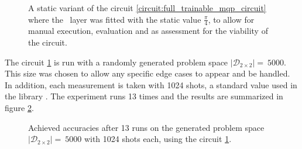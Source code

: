 \begin{figure}[!h]
    \centering
    \caption{A static variant of the circuit \ref{circuit:full_trainable_mqp_circuit} where the \rxgate\ layer was fitted with the static value $\frac{\pi}{4}$, to allow for manual execution, evaluation and as assessment for the viability of the circuit.}
    \label{circuit:static_mqo_circuit}
\end{figure}

The circuit \ref{circuit:static_mqo_circuit} is run with a randomly generated problem space $\left|\mathcal{D}_{2\times2}\right| =\ 5000$. This size was chosen to allow any specific edge cases to appear and be handled. In addition, each measurement is taken with 1024 shots, a standard value used in the library . The experiment runs 13 times and the results are summarized in figure \ref{figure:boxplot_static_circuit_accuracies}.

\newpage

\begin{figure}[!ht]
    \centering
    \scalebox{0.6}{
        
    }
    \caption{Achieved accuracies after 13 runs on the generated problem space $\left|\mathcal{D}_{2\times2}\right| =\ 5000$ with 1024 shots each, using the circuit \ref{circuit:static_mqo_circuit}.}
    \label{figure:boxplot_static_circuit_accuracies}
\end{figure}

